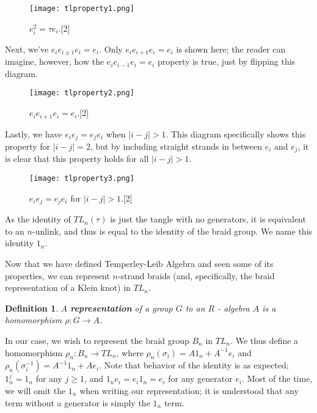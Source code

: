 \documentclass[12pt]{article}
\newtheorem{definition}{Definition}[section]
\begin{document}
\begin{figure}[H]

\centering
\texttt{[image: tlproperty1.png]}
\caption{\label{Prop 1} $e_i^2 = \tau e_i$.[2]}
\end{figure}

Next, we've $e_i e_{i \pm 1} e_i =e_i$. Only $e_i e_{i + 1} e_i = e_i$ is shown here; the reader can imagine, however, how the $e_i e_{i - 1} e_i = e_i$ property is true, just by flipping this diagram. 

\begin{figure}[H]

\centering
\texttt{[image: tlproperty2.png]}
\caption{\label{Prop 1} $e_i e_{i +1} e_i = e_i$.[2]}
\end{figure}




Lastly, we have $e_i e_j = e_j e_i$ when $|i - j| > 1$. This diagram specifically shows this property for $|i - j| = 2$, but by including straight strands in between $e_i$ and $e_j$, it is clear that this property holds for all $|i - j| > 1$. 
\begin{figure}[H]

\centering
\texttt{[image: tlproperty3.png]}
\caption{\label{Prop 1} $e_i e_j = e_j e_i$ for $|i - j| > 1$.[2]}
\end{figure}


As the identity of $TL_n(\tau)$ is just the tangle with no generators, it is equivalent to an $n$-unlink, and thus is equal to the identity of the braid group. We name this identity $1_n$. 

Now that we have defined Temperley-Leib Algebra and seen some of its properties, we can represent $n$-strand braids (and, specifically, the braid representation of a Klein knot) in $TL_n$. 

\begin{definition}
A \textbf{representation} of a group $G$ to an $R$ - algebra $A$ is a homomorphism $\rho: G \rightarrow A$.
\end{definition}

In our case, we wish to represent the braid group $B_n$ in $TL_n$. We thus define a homomorphism $\rho_n: B_n \rightarrow TL_n$, where $\rho_n(\sigma_i) = A 1_n+ A^{-1} e_i$ and $\rho_n(\sigma_i^{-1}) = A^{-1} 1_n + Ae_i$. Note that behavior of the identity is as expected; $1_n^j = 1_n$ for any $j \geq 1$, and $1_n e_i = e_i 1_n = e_i$ for any generator $e_i$. Most of the time, we will omit the $1_n$ when writing our representation; it is understood that any term without a generator is simply the $1_n$ term. 
\end{document}
